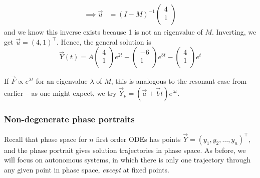 \documentclass{../template/note}
\begin{document}
\begin{example}
\begin{align*}
            \implies \vec u &= (I - M)^{-1} \begin{pmatrix}
             4 \\
             1 \\
            \end{pmatrix}
        \end{align*}
        and we know this inverse exists because 1 is not an eigenvalue of \(M\). Inverting, we get \(\vec u = (4, 1)^\intercal\). Hence, the general solution is
        \[
            \vec Y(t) = A \begin{pmatrix}
             4 \\
             1 \\
            \end{pmatrix} e^{2t} + \begin{pmatrix}
             -6 \\
             1 \\
            \end{pmatrix} e^{8t} - \begin{pmatrix}
             4 \\
             1 \\
            \end{pmatrix} e^t
        \]
    \end{example}
    
    \begin{remark}
        If \(\vec F \propto e^{\lambda t}\) for an eigenvalue \(\lambda\) of \(M\), this is analogous to the resonant case from earlier -- as one might expect, we try \(\vec Y_p = (\vec a + \vec b t)e^{\lambda t}\).
    \end{remark}
    
    \subsubsection{Non-degenerate phase portraits}

    Recall that phase space for \(n\) first order ODEs has points \(\vec Y = (y_1, y_2, \dots, y_n)^\intercal\), and the phase portrait gives solution trajectories in phase space. As before, we will focus on autonomous systems, in which there is only one trajectory through any given point in phase space, \emph{except} at fixed points.
\end{document}
